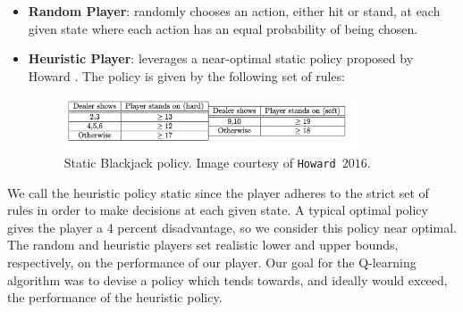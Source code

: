\begin{itemize}
    \item \textbf{Random Player}: randomly chooses an action, either hit or stand, at each given state where each action has an equal probability of being chosen. 
    \item \textbf{Heuristic Player}: leverages a near-optimal static policy proposed by Howard \cite{o}. The policy is given by the following set of rules: \ 
    
    \begin{figure}[htb]
      \centering  %
      \includegraphics[width = 3.4in]{a.png} 
      \caption{Static Blackjack policy. Image courtesy of \texttt{Howard $2016$}.}
     \label{fig:tex}

    \end{figure}
\end{itemize}
\noindent We call the heuristic policy static since the player adheres to the strict set of rules in order to make decisions at each given state. A typical optimal policy gives the player a 4 percent disadvantage, so we consider this policy near optimal. \\

\noindent The random and heuristic players set realistic lower and upper bounds, respectively, on the performance of our player. Our goal for the Q-learning algorithm was to devise a policy which tends towards, and ideally would exceed, the performance of the heuristic policy. 



